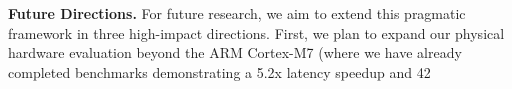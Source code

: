 \textbf{Future Directions.} For future research, we aim to extend this pragmatic framework in three high-impact directions. First, we plan to expand our physical hardware evaluation beyond the ARM Cortex-M7 (where we have already completed benchmarks demonstrating a 5.2x latency speedup and 42%
